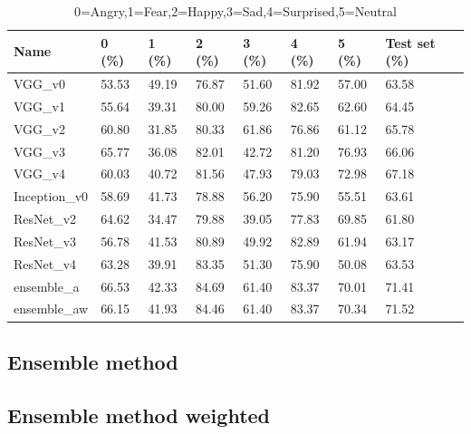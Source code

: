 \documentclass[10pt,twocolumn,letterpaper]{article}
\begin{document}
\def\arraystretch{1.2}
\begin{table}[H]
   \scriptsize
   \begin{tabular}{L{1.1cm}C{0.5cm}C{0.5cm}C{0.5cm}C{0.5cm}C{0.5cm}C{0.5cm}C{0.8cm}}
      \hline
      Name          & 0 (\%) & 1 (\%) & 2 (\%) & 3 (\%) & 4 (\%) & 5 (\%) & Test set (\%) \\
      \hline\hline
      VGG\_v0       & 53.53  & 49.19  & 76.87  & 51.60  & 81.92  & 57.00  & 63.58         \\
      VGG\_v1       & 55.64  & 39.31  & 80.00  & 59.26  & 82.65  & 62.60  & 64.45         \\
      VGG\_v2       & 60.80  & 31.85  & 80.33  & 61.86  & 76.86  & 61.12  & 65.78         \\
      VGG\_v3       & 65.77  & 36.08  & 82.01  & 42.72  & 81.20  & 76.93  & 66.06         \\
      VGG\_v4       & 60.03  & 40.72  & 81.56  & 47.93  & 79.03  & 72.98  & 67.18         \\
      Inception\_v0 & 58.69  & 41.73  & 78.88  & 56.20  & 75.90  & 55.51  & 63.61         \\
      ResNet\_v2    & 64.62  & 34.47  & 79.88  & 39.05  & 77.83  & 69.85  & 61.80         \\
      ResNet\_v3    & 56.78  & 41.53  & 80.89  & 49.92  & 82.89  & 61.94  & 63.17         \\
      ResNet\_v4    & 63.28  & 39.91  & 83.35  & 51.30  & 75.90  & 50.08  & 63.53         \\
      ensemble\_a    & 66.53 & 42.33 & 84.69 & 61.40 & 83.37 & 70.01 & 71.41\\
      ensemble\_aw   & 66.15 & 41.93 & 84.46 & 61.40 & 83.37 & 70.34 & 71.52\\

      \hline
   \end{tabular}
   \caption{0=Angry,1=Fear,2=Happy,3=Sad,4=Surprised,5=Neutral}
\end{table}
\subsection*{Ensemble method}
\subsection*{Ensemble method weighted}
\end{document}
